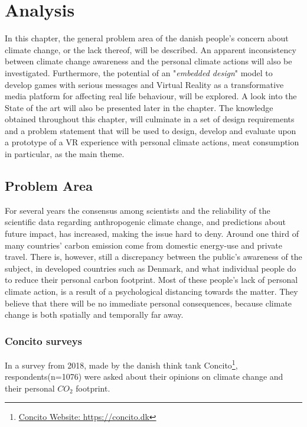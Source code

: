 \chapter{Analysis}\label{chap:analysis}
    In this chapter, the general problem area of the danish people's concern about climate change, or the lack thereof, will be described. An apparent inconsistency between climate change awareness and the personal climate actions will also be investigated. Furthermore, the potential of an "\textit{embedded design}" model to develop games with serious messages and Virtual Reality as a transformative media platform for affecting real life behaviour, will be explored. A look into the State of the art will also be presented later in the chapter. The knowledge obtained throughout this chapter, will culminate in a set of design requirements and a problem statement that will be used to design, develop and evaluate upon a prototype of a VR experience with personal climate actions, meat consumption in particular, as the main theme.

\section{Problem Area}\label{sec:problemArea}
    For several years the consensus among scientists and the reliability of the scientific data regarding anthropogenic climate change, and predictions about future impact, has increased, making the issue hard to deny\cite{the5Ds, scientistConsensus, publicEngagementUnderstanding}. Around one third of many countries' carbon emission come from domestic energy-use and private travel\cite{reorientingClimageChangeCommunication}. There is, however, still a discrepancy between the public's awareness of the subject, in developed countries such as Denmark, and what individual people do to reduce their personal carbon footprint. Most of these people's lack of personal climate action, is a result of a psychological distancing towards the matter\cite{the5Ds, publicEngagementUnderstanding}. They believe that there will be no immediate personal consequences, because climate change is both spatially and temporally far away\cite{publicEngagementUnderstanding}.
    
    \subsection{Concito surveys}
        In a survey from 2018, made by the danish think tank Concito\footnote{\href{https://concito.dk}{Concito Website: https://concito.dk}}, respondents(n=1076) were asked about their opinions on climate change and their personal ${CO_2}$ footprint.
        
